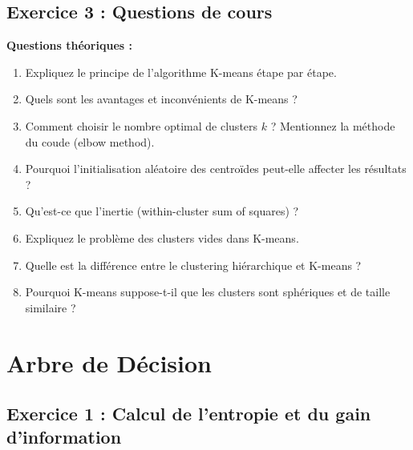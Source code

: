 \documentclass[11pt,a4paper]{article}
\begin{document}
\subsection{Exercice 3 : Questions de cours}

\begin{questionbox}
\textbf{Questions théoriques :}
\begin{enumerate}
    \item Expliquez le principe de l'algorithme K-means étape par étape.
    
    \item Quels sont les avantages et inconvénients de K-means ?
    
    \item Comment choisir le nombre optimal de clusters $k$ ? Mentionnez la méthode du coude (elbow method).
    
    \item Pourquoi l'initialisation aléatoire des centroïdes peut-elle affecter les résultats ?
    
    \item Qu'est-ce que l'inertie (within-cluster sum of squares) ?
    
    \item Expliquez le problème des clusters vides dans K-means.
    
    \item Quelle est la différence entre le clustering hiérarchique et K-means ?
    
    \item Pourquoi K-means suppose-t-il que les clusters sont sphériques et de taille similaire ?
\end{enumerate}
\end{questionbox}

\newpage


\section{Arbre de Décision}

\subsection{Exercice 1 : Calcul de l'entropie et du gain d'information}
\end{document}
